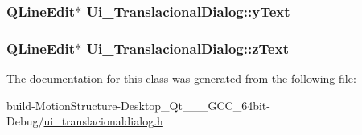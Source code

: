\hypertarget{class_ui___translacional_dialog_a5f48505552db27605a8d8da569752d25}{
\subsubsection[{y\-Text}]{\setlength{\rightskip}{0pt plus 5cm}Q\-Line\-Edit$\ast$ Ui\-\_\-\-Translacional\-Dialog\-::y\-Text}}\label{class_ui___translacional_dialog_a5f48505552db27605a8d8da569752d25}
\hypertarget{class_ui___translacional_dialog_a4c195ebd2f2d8aed1cb9060074e8996d}{
\subsubsection[{z\-Text}]{\setlength{\rightskip}{0pt plus 5cm}Q\-Line\-Edit$\ast$ Ui\-\_\-\-Translacional\-Dialog\-::z\-Text}}\label{class_ui___translacional_dialog_a4c195ebd2f2d8aed1cb9060074e8996d}


The documentation for this class was generated from the following file\-:\begin{DoxyCompactItemize}
\item 
build-\/\-Motion\-Structure-\/\-Desktop\-\_\-\-Qt\-\_\-\_\-\_\-\-G\-C\-C\-\_\-64bit-\/\-Debug/\hyperlink{ui__translacionaldialog_8h}{ui\-\_\-translacionaldialog.\-h}\end{DoxyCompactItemize}
